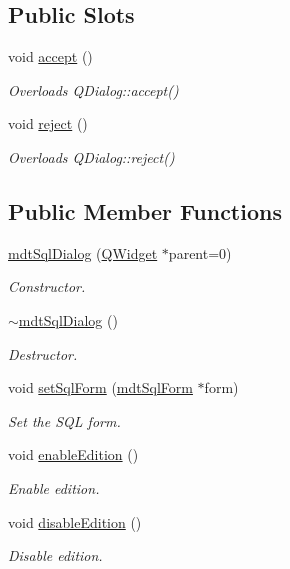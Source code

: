 \subsection*{Public Slots}
\begin{DoxyCompactItemize}
\item 
void \hyperlink{classmdt_sql_dialog_affba1732b5f32db150d0e700ecc339f8}{accept} ()
\begin{DoxyCompactList}\small\item\em Overloads Q\-Dialog\-::accept() \end{DoxyCompactList}\item 
void \hyperlink{classmdt_sql_dialog_ada1726d5861cb071fab7a1c31bc52abb}{reject} ()
\begin{DoxyCompactList}\small\item\em Overloads Q\-Dialog\-::reject() \end{DoxyCompactList}\end{DoxyCompactItemize}
\subsection*{Public Member Functions}
\begin{DoxyCompactItemize}
\item 
\hyperlink{classmdt_sql_dialog_a9588f53afba818d79ff0f2e9eaeed50f}{mdt\-Sql\-Dialog} (\hyperlink{class_q_widget}{Q\-Widget} $\ast$parent=0)
\begin{DoxyCompactList}\small\item\em Constructor. \end{DoxyCompactList}\item 
\hyperlink{classmdt_sql_dialog_a845d9f4eef1c590d5e854540e18b00a6}{$\sim$mdt\-Sql\-Dialog} ()
\begin{DoxyCompactList}\small\item\em Destructor. \end{DoxyCompactList}\item 
void \hyperlink{classmdt_sql_dialog_aa4b143efbe21073e1668d75cdf262a39}{set\-Sql\-Form} (\hyperlink{classmdt_sql_form}{mdt\-Sql\-Form} $\ast$form)
\begin{DoxyCompactList}\small\item\em Set the S\-Q\-L form. \end{DoxyCompactList}\item 
void \hyperlink{classmdt_sql_dialog_a47de595aa2a117cdc3eb5de4a6bbf8f5}{enable\-Edition} ()
\begin{DoxyCompactList}\small\item\em Enable edition. \end{DoxyCompactList}\item 
void \hyperlink{classmdt_sql_dialog_a22e77e80b419d9bb23703c253b1a246e}{disable\-Edition} ()
\begin{DoxyCompactList}\small\item\em Disable edition. \end{DoxyCompactList}\end{DoxyCompactItemize}


